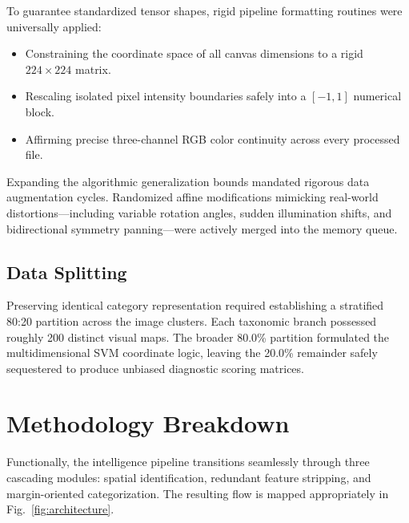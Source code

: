 \documentclass[conference]{IEEEtran}
\begin{document}
To guarantee standardized tensor shapes, rigid pipeline formatting routines were universally applied:
\begin{itemize}
    \item Constraining the coordinate space of all canvas dimensions to a rigid $224 \times 224$ matrix.
    \item Rescaling isolated pixel intensity boundaries safely into a $[-1, 1]$ numerical block.
    \item Affirming precise three-channel RGB color continuity across every processed file.
\end{itemize}

Expanding the algorithmic generalization bounds mandated rigorous data augmentation cycles. Randomized affine modifications mimicking real-world distortions—including variable rotation angles, sudden illumination shifts, and bidirectional symmetry panning—were actively merged into the memory queue.

\subsection{Data Splitting}
Preserving identical category representation required establishing a stratified 80:20 partition across the image clusters. Each taxonomic branch possessed roughly 200 distinct visual maps. The broader 80.0\% partition formulated the multidimensional SVM coordinate logic, leaving the 20.0\% remainder safely sequestered to produce unbiased diagnostic scoring matrices.

\section{Methodology Breakdown}

Functionally, the intelligence pipeline transitions seamlessly through three cascading modules: spatial identification, redundant feature stripping, and margin-oriented categorization. The resulting flow is mapped appropriately in Fig.~\ref{fig:architecture}.
\end{document}
